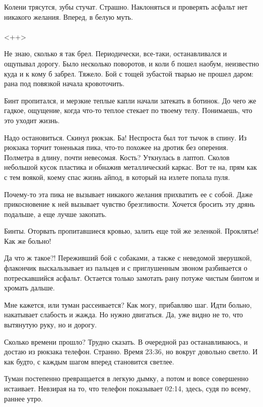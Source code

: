 \documentclass[a4paper]{book}
\begin{document}
Колени трясутся, зубы стучат. Страшно. Наклоняться и проверять асфальт нет никакого желания. Вперед, в белую муть.
\\
\paragraph{}<++>



Не знаю, сколько я так брел. Периодически, все-таки, останавливался и ощупывал дорогу. Было несколько поворотов, и коли б пошел наобум, неизвестно куда и к кому б забрел. Тяжело. Бой с тощей зубастой тварью не прошел даром: рана под повязкой начала кровоточить.

Бинт пропитался, и мерзкие теплые капли начали затекать в ботинок. До чего же гадкое, ощущение, когда что-то теплое стекает по твоему телу. Понимаешь, что это уходит жизнь. 

Надо остановиться. Скинул рюкзак. Ба! Неспроста был тот тычок в спину. Из рюкзака торчит тоненькая пика, что-то похожее на дротик без оперения. Полметра в длину, почти невесомая. Кость? Уткнулась в лаптоп. Сколов небольшой кусок пластика и обнажив металлический каркас. Вот те на, прям как с тем воякой, коему спас жизнь айпод, в который на излете попала пуля.

Почему-то эта пика не вызывает никакого желания прихватить ее с собой. Даже прикосновение к ней вызывает чувство брезгливости. Хочется бросить эту дрянь подальше, а еще лучше закопать. 

Бинты. Оторвать пропитавшиеся кровью, залить еще той же зеленкой. Проклятье! Как же больно! 

Да что ж такое?! Переживший бой с собаками, а также с неведомой зверушкой, флакончик выскальзывает из пальцев и с приглушенным звоном разбивается о потрескавшийся асфальт.  Остается только замотать рану потуже чистым бинтом и хромать дальше. 

Мне кажется, или туман рассеивается? Как могу, прибавляю шаг. Идти больно, накатывает слабость и жажда. Но нужно двигаться. Да, уже видно не то, что вытянутую руку, но и дорогу. 

Сколько времени прошло? Трудно сказать. В очередной раз останавливаюсь, и достаю из рюкзака телефон. Странно. Время 23:36, но вокруг довольно светло. И как будто, с каждым шагом вперед становится светлее.  

Туман постепенно превращается в легкую дымку, а потом и вовсе совершенно истаивает. Невзирая на то, что телефон показывает 02:14, здесь, судя по всему, раннее утро. 
\end{document}
